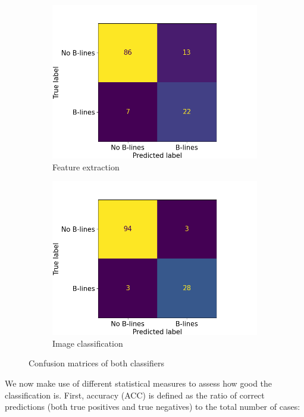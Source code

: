 \documentclass[11pt]{article} %
\begin{document}
	\begin{figure}
	\centering
		\begin{subfigure}{0.45\textwidth}
		\includegraphics[width=\textwidth]{figuras/logistic_confusion.png}
		\caption{Feature extraction}
		\end{subfigure}
		\begin{subfigure}{0.45\textwidth}
		\includegraphics[width=\textwidth]{figuras/svc_confusion.png}
		\caption{Image classification}
		\end{subfigure}

	\caption{Confusion matrices of both classifiers}
	\end{figure}
	
	We now make use of different statistical measures to assess how good the classification is. First, accuracy (ACC) is defined as the ratio of correct predictions (both true positives and true negatives) to the total number of cases: 
	
\end{document}
